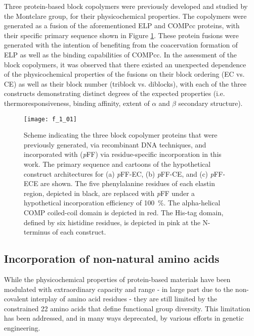 \begin{refsection}
Three protein-based block copolymers were previously developed and studied by
the Montclare group,\cite{Haghpanah2010,Haghpanah2009} for their physicochemical
properties. The copolymers were generated as a fusion of the aforementioned ELP
and COMPcc proteins, with their specific primary sequence shown in Figure
\ref{fig:pff_proteins}. These protein fusions were generated with the intention
of benefiting from the coacervation formation of ELP as well as the binding
capabilities of COMPcc. In the assessment of the block copolymers, it was
observed that there existed an unexpected dependence of the physicochemical
properties of the fusions on their block ordering (EC vs. CE) as well as their
block number (triblock vs. diblocks), with each of the three constructs
demonstrating distinct degrees of the expected properties (i.e.
thermoresponsiveness, binding affinity, extent of ${\alpha}$ and ${\beta}$
secondary structure).
\begin{figure}[h!]
    \centering
    \texttt{[image: f\_1\_01]}
    \caption{Scheme indicating the three block copolymer proteins that were
        previously generated, via recombinant DNA techniques, and incorporated
        with  (\emph{p}FF) via residue-specific
        incorporation in this work. The primary sequence and cartoons of
        the hypothetical construct architectures for (a) \emph{p}FF-EC, (b)
        \emph{p}FF-CE, and (c) \emph{p}FF-ECE are shown. The five phenylalanine
        residues of each elastin region, depicted in black, are replaced with
        \emph{p}FF under a hypothetical incorporation efficiency of
        \SI{100}{\percent}. The alpha-helical COMP coiled-coil domain is
        depicted in red. The His-tag domain, defined by six histidine residues,
        is depicted in pink at the N-terminus of each construct.
    }
    \label{fig:pff_proteins}
\end{figure}
\subsection{Incorporation of non-natural amino acids}

While the physicochemical properties of protein-based materials have been
modulated with extraordinary capacity and range - in large part due to
the non-covalent interplay of amino acid residues - they are still limited by
the constrained 22 amino acids that define functional group diversity.
This limitation has been addressed, and in many ways deprecated, by various
efforts in genetic engineering.


\end{refsection}
